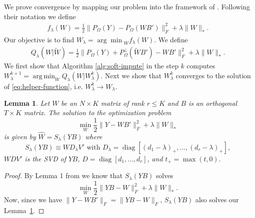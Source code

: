 \documentclass[preprint]{imsart}
\numberwithin{equation}{section}
\theoremstyle{plain}
\newtheorem{lemma}{Lemma}
\DeclareMathOperator*{\argmin}{arg\,min}
\DeclareMathOperator*{\diag}{diag}
\begin{document}
We prove convergence by mapping our problem into the framework of \citet{mazumder2010spectral}.
Following their notation we define
\begin{align}\label{eq:helper-function}
 f_\lambda(W) = \frac{1}{2} \|P_{\Omega}(Y) - P_{\Omega}(WB')\|_F^2 + \lambda\|W\|_*.
\end{align}
Our objective is to find $ W_\lambda = {\arg\min}_W f_\lambda(W)$. We define
\begin{align}\label{eq:q}
Q_\lambda(W|\tilde{W}) = \frac{1}{2}\|P_{\Omega}(Y) + P_{\Omega}^{\perp}(\tilde{W} B') - WB'\|_F^2 + \lambda \|W\|_*.
\end{align}
We first show that Algorithm \ref{alg:soft-impute} in the step $k$ computes $W_\lambda^{k+1} = \argmin_W Q_\lambda(W|W_\lambda^k)$. Next we show that $W_\lambda^k$ converges to the solution of \eqref{eq:helper-function}, i.e. $W_\lambda^k \rightarrow W_\lambda$.
\begin{lemma}\label{lemma:svt}
Let $W$ be an $N \times K$ matrix of rank $r \leq K$ and $B$ is an orthogonal $T \times K$ matrix. The solution to the optimization problem
\begin{equation}\label{eq:lemma1}
\min_W \frac{1}{2}\|Y - WB' \|_F^2 + \lambda\|W\|_*
\end{equation}
is given by $\hat{W} = S_\lambda(YB)$ where
\[
S_\lambda(YB) \equiv WD_\lambda V' \text{ with } D_\lambda = \diag[(d_1 - \lambda)_+, ..., (d_r - \lambda)_+],
\]
$WDV'$ is the SVD of $YB$, $D = \diag[d_1,...,d_r]$, and $t_+ = \max(t,0)$.
\end{lemma}
\begin{proof}
By Lemma 1 from \citet{mazumder2010spectral} we know that $S_\lambda(YB)$ solves
\[
\min_W \frac{1}{2}\|YB - W \|_F^2 + \lambda\|W\|_*.
\]
Now, since we have $\|Y - WB' \|_F = \|YB - W \|_F$, $S_\lambda(YB)$ also solves our Lemma~\ref{lemma:svt}.
\end{proof}
\end{document}
